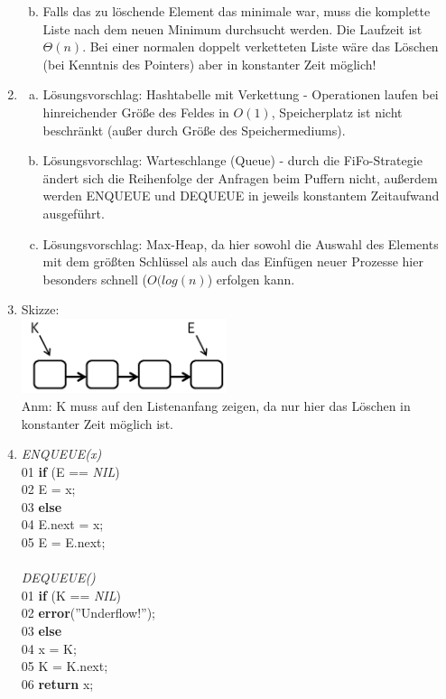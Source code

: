 \documentclass{scrartcl}
\begin{document}
\begin{enumerate}[(1)]
\begin{enumerate}[(a)]
\begin{verbatim}
\end{verbatim}
\item Falls das zu l\"oschende Element das minimale war, muss die komplette Liste nach dem neuen Minimum durchsucht werden. Die Laufzeit ist $\Theta(n)$. Bei einer normalen doppelt verketteten Liste w\"are das L\"oschen (bei Kenntnis des Pointers) aber in konstanter Zeit m\"oglich!
\end{enumerate}

\item
\begin{enumerate}[(a)]
\item Lösungsvorschlag: Hashtabelle mit Verkettung - Operationen laufen bei hinreichender Größe des Feldes in $O(1)$, Speicherplatz ist nicht beschränkt (außer durch Größe des Speichermediums).
\item Lösungsvorschlag: Warteschlange (Queue) - durch die FiFo-Strategie ändert sich die Reihenfolge der Anfragen beim Puffern nicht, außerdem werden ENQUEUE und DEQUEUE in jeweils konstantem Zeitaufwand ausgeführt.
\item Lösungsvorschlag: Max-Heap, da hier sowohl die Auswahl des Elements mit dem größten Schlüssel als auch das Einfügen neuer Prozesse hier besonders schnell ($O(log(n)$) erfolgen kann. 
\end{enumerate}

\item Skizze: \\
	\includegraphics[width=6cm]{QueueListe}\\
	Anm: K muss auf den Listenanfang zeigen, da nur hier das Löschen in konstanter Zeit möglich ist.
\item \textit{ENQUEUE(x)}\\
	01 \tab \textbf{if} (E == \textit{NIL})\\
	02 \tab \tab E = x;\\
	03 \tab \textbf{else\\}
	04 \tab \tab  E.next = x;\\
	05 \tab \tab E = E.next;\\
	\ \\
	\textit{DEQUEUE()}\\
	01 \tab \textbf{if} (K == \textit{NIL})\\
	02 \tab \tab \textbf{error}(''Underflow!'');\\
	03 \tab \textbf{else}\\
	04 \tab \tab x = K;\\
	05 \tab \tab K = K.next;\\
	06 \tab \tab \textbf{return} x;

\end{enumerate}
\end{document}
